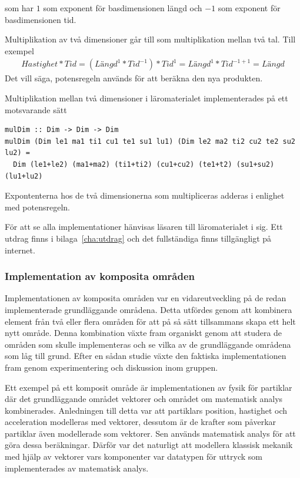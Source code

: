 \begin{draft}
som har $1$ som exponent för basdimensionen längd och $-1$ som exponent för
basdimensionen tid.

Multiplikation av två dimensioner går till som multiplikation mellan två tal.
Till exempel \begin{align*}
  Hastighet * Tid = (Längd^1 * Tid^{-1}) * Tid^1 = Längd^1 * Tid^{-1 + 1} =
  Längd \end{align*}
Det vill säga, potensregeln används för att beräkna den nya produkten.

Multiplikation mellan två dimensioner i läromaterialet implementerades på ett
motsvarande sätt

\begin{lstlisting}[frame=none, belowskip=-0.5\baselineskip, xleftmargin=0.5in]
mulDim :: Dim -> Dim -> Dim
mulDim (Dim le1 ma1 ti1 cu1 te1 su1 lu1) (Dim le2 ma2 ti2 cu2 te2 su2 lu2) =
  Dim (le1+le2) (ma1+ma2) (ti1+ti2) (cu1+cu2) (te1+t2) (su1+su2) (lu1+lu2)
\end{lstlisting}

Expontenterna hos de två dimensionerna som multipliceras adderas i enlighet med
potensregeln.

För att se alla implementationer hänvisas läsaren till läromaterialet i sig. Ett
utdrag finns i bilaga~\ref{cha:utdrag} och det fullständiga finns tillgängligt
på internet\cite{LYAP}.

\subsubsection*{Implementation av komposita områden}

Implementationen av komposita områden var en vidareutveckling på de redan
implementerade grundläggande områdena. Detta utfördes genom att kombinera
element från två eller flera områden för att på så sätt tillsammans skapa ett
helt nytt område. Denna kombination växte fram organiskt genom att studera de
områden som skulle implementeras och se vilka av de grundläggande områdena som
låg till grund. Efter en sådan studie växte den faktiska implementationen fram
genom experimentering och diskussion inom gruppen.

Ett exempel på ett komposit område är implementationen av fysik för partiklar
där det grundläggande området vektorer och området om matematisk analys
kombinerades. Anledningen till detta var att partiklars position, hastighet och
acceleration modelleras med vektorer, dessutom är de krafter som påverkar
partiklar även modellerade som vektorer. Sen används matematisk analys för att
göra dessa beräkningar. Därför var det naturligt att modellera klassisk mekanik
med hjälp av vektorer vars komponenter var datatypen för uttryck som
implementerades av matematisk analys.


\end{draft}
